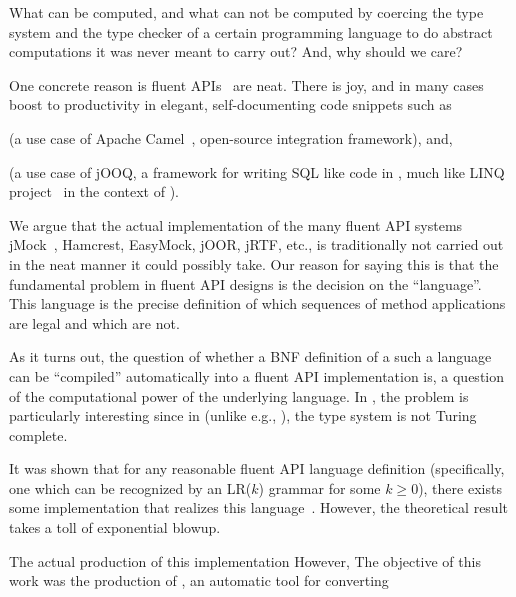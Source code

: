 What can be computed, and what can not be computed by coercing the type system
and the type checker of a certain programming language to do abstract
computations it was never meant to carry out? And, why should we care? 

One concrete reason is fluent
APIs~\cite{VanDeursen:Klint:2000,Hudak:1997,Fowler:2010} are neat. 
There is joy, and in many cases boost to productivity
  in elegant,  self-documenting code snippets such as
\begin{quote}
  \label{figure:DSL}
  \parbox[c]{44ex}{}
\end{quote}
(a use case of Apache Camel~\cite{Ibsen:Anstey:10}, open-source integration
framework), and,
\begin{quote}
\end{quote}
(a use case of jOOQ, a framework for writing
SQL like code in \Java, much like LINQ project~\cite{Meijer:Beckman:Bierman:06}
in the context of \CSharp).

We argue that 
  the actual implementation of the many fluent API systems
jMock~\cite{Freeman:Pryce:06},
Hamcrest,
EasyMock,
jOOR,
jRTF,
etc., is traditionally not carried out
in the neat manner it could possibly take.
Our reason for saying this is that the fundamental problem in 
  fluent API designs is the decision on the ``language''.  
This language is the precise definition of which sequences of method
applications are legal and which are not.

As it turns out, the question of whether a BNF definition of a such a language
can be ``compiled'' automatically into a fluent API implementation is, a
question of the computational power of the underlying language. In \Java, the problem
is particularly interesting since in \Java (unlike e.g., \CC\cite{Gutterman:2003}),
the type system is not Turing complete.

It was shown that for any reasonable fluent API language definition
(specifically, one which can be recognized by an LR($k$) grammar for some $k \ge 0$),
there exists some \Java implementation that realizes this language~\cite{Gil:Levy:2016}.
However, the theoretical result takes a toll of exponential blowup.

The actual production of this implementation
However, 
The objective of this work was the production of \Fajita, an automatic tool for
converting 

